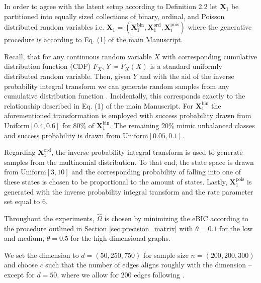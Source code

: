 In order to agree with the latent setup according to Definition 2.2
let $\mathbf{X}_1$ be partitioned into equally sized collections of binary, ordinal, and Poisson distributed random variables i.e. $\mathbf{X}_1 = (\mathbf{X}_1^{\text{bin}}, \mathbf{X}_1^{\text{ord}},\mathbf{X}_1^{\text{pois}})$ where the generative procedure is according to Eq. (1) of the main Manuscript. %

Recall, that for any continuous random variable $X$ with corresponding cumulative distribution function (CDF) $F_X$, $Y \coloneqq F_X(X)$ is a standard uniformly distributed random variable. Then, given $Y$ and with the aid of the inverse probability integral transform we can generate random samples from any cumulative distribution function \citep{Angus94}. Incidentally, this corresponds exactly to the relationship described in Eq. (1) of the main Manuscript.
For $\mathbf{X}_1^{\text{bin}}$ the aforementioned transformation is employed with success probability drawn from Uniform$[0.4,0.6]$ for $80\%$ of $\mathbf{X}_1^{\text{bin}}$. The remaining $20\%$ mimic unbalanced classes and success probability is drawn from Uniform$[0.05,0.1]$.

Regarding $\mathbf{X}_1^{\text{ord}}$, the inverse probability integral transform is used to generate samples from the multinomial distribution. To that end, the state space is drawn from Uniform$[3,10]$ and the corresponding probability of falling into one of these states is chosen to be proportional to the amount of states. Lastly, $\mathbf{X}_1^{\text{pois}}$ is generated with the inverse probability integral transform and the rate parameter set equal to $6$.


Throughout the experiments, $\hat{\Omega}$ is chosen by minimizing the eBIC according to the procedure outlined in Section \ref{sec:precision_matrix} with $\theta = 0.1$ for the low and medium, $\theta = 0.5$ for the high dimensional graphs.

We set the dimension to $d = (50, 250, 750)$ for sample size $n = (200, 200, 300)$ and choose $c$ such that the number of edges aligns roughly with the dimension -- except for $d = 50$, where we allow for $200$ edges following \citet{Fan17}.


